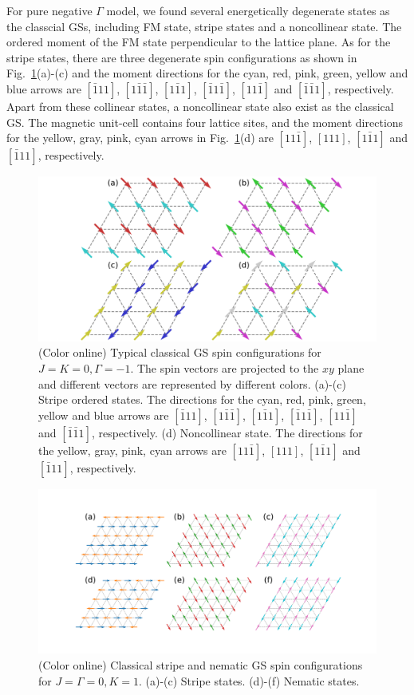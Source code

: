 \documentclass[aps,prb,reprint,amsfonts,amsmath,amssymb,showpacs,groupedaddress,superscriptaddress]{revtex4-1}
\begin{document}
For pure negative $\Gamma$ model, we found several energetically degenerate states as the classcial GSs, including FM state, stripe states and a noncollinear state. The ordered moment of the FM state perpendicular to the lattice plane. As for the stripe states, there are three degenerate spin configurations as shown in Fig.~\ref{fig:GSForNegativeGamma}(a)-(c) and the moment directions for the cyan, red, pink, green, yellow and blue arrows are $[\bar{1}11]$, $[1\bar{1}\bar{1}]$, $[1\bar{1}1]$, $[\bar{1}1\bar{1}]$, $[11\bar{1}]$ and $[\bar{1}\bar{1}1]$, respectively. Apart from these collinear states, a noncollinear state also exist as the classical GS. The magnetic unit-cell contains four lattice sites, and the moment directions for the yellow, gray, pink, cyan arrows in Fig.~\ref{fig:GSForNegativeGamma}(d) are $[11\bar{1}]$, $[111]$, $[1\bar{1}1]$ and $[\bar{1}11]$, respectively.
\begin{figure}
    \includegraphics[width=\columnwidth]{fig/SpinConfigForNegativeGamma.pdf}
    \caption{\label{fig:GSForNegativeGamma}(Color online) Typical classical GS spin configurations for $J=K=0, \Gamma=-1$. The spin vectors are projected to the $xy$ plane and different vectors are represented by different colors. (a)-(c) Stripe ordered states. The directions for the cyan, red, pink, green, yellow and blue arrows are $[\bar{1}11]$, $[1\bar{1}\bar{1}]$, $[1\bar{1}1]$, $[\bar{1}1\bar{1}]$, $[11\bar{1}]$ and $[\bar{1}\bar{1}1]$, respectively. (d) Noncollinear state. The directions for the yellow, gray, pink, cyan arrows are $[11\bar{1}]$, $[111]$, $[1\bar{1}1]$ and $[\bar{1}11]$, respectively.}
\end{figure}
\begin{figure}
    \includegraphics[width=\columnwidth]{fig/SpinConfigForPositiveKitaev.pdf}
    \caption{\label{fig:GSForPositiveK}(Color online) Classical stripe and nematic GS spin configurations for $J=\Gamma=0, K=1$. (a)-(c) Stripe states. (d)-(f) Nematic states.}
\end{figure}
\end{document}
